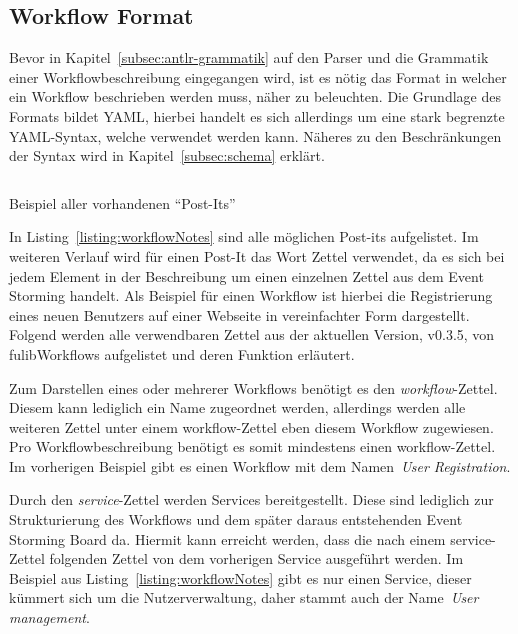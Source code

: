 \subsection{Workflow Format}\label{subsec:workflow-format}
Bevor in Kapitel~\ref{subsec:antlr-grammatik} auf den Parser und die Grammatik einer Workflowbeschreibung eingegangen wird,
ist es nötig das Format in welcher ein Workflow beschrieben werden muss, näher zu beleuchten.
Die Grundlage des Formats bildet \ac{YAML}, hierbei handelt es sich allerdings um eine stark begrenzte YAML-Syntax, welche verwendet werden kann.
Näheres zu den Beschränkungen der Syntax wird in Kapitel~\ref{subsec:schema} erklärt.

\begin{listing}[!ht]
    \inputminted{yaml}{listings/3.1.1/allNotes.es.yaml}
    \caption{Beispiel aller vorhandenen ``Post-Its''}
    \label{listing:workflowNotes}
\end{listing}

In Listing~\ref{listing:workflowNotes} sind alle möglichen Post-its aufgelistet.
Im weiteren Verlauf wird für einen Post-It das Wort Zettel verwendet, da es sich bei jedem Element in der Beschreibung um einen einzelnen Zettel aus dem Event Storming handelt.
Als Beispiel für einen Workflow ist hierbei die Registrierung eines neuen Benutzers auf einer Webseite in vereinfachter Form dargestellt.
Folgend werden alle verwendbaren Zettel aus der aktuellen Version, v0.3.5, von fulibWorkflows aufgelistet und deren Funktion erläutert.


Zum Darstellen eines oder mehrerer Workflows benötigt es den \textit{workflow}-Zettel.
Diesem kann lediglich ein Name zugeordnet werden, allerdings werden alle weiteren Zettel unter einem workflow-Zettel eben diesem Workflow zugewiesen.
Pro Workflowbeschreibung benötigt es somit mindestens einen workflow-Zettel.
Im vorherigen Beispiel gibt es einen Workflow mit dem Namen~\textit{User Registration}.


Durch den \textit{service}-Zettel werden Services bereitgestellt.
Diese sind lediglich zur Strukturierung des Workflows und dem später daraus entstehenden Event Storming Board da.
Hiermit kann erreicht werden, dass die nach einem service-Zettel folgenden Zettel von dem vorherigen Service ausgeführt werden.
Im Beispiel aus Listing~\ref{listing:workflowNotes} gibt es nur einen Service, dieser kümmert sich um die Nutzerverwaltung, daher
stammt auch der Name~\textit{User management}.

